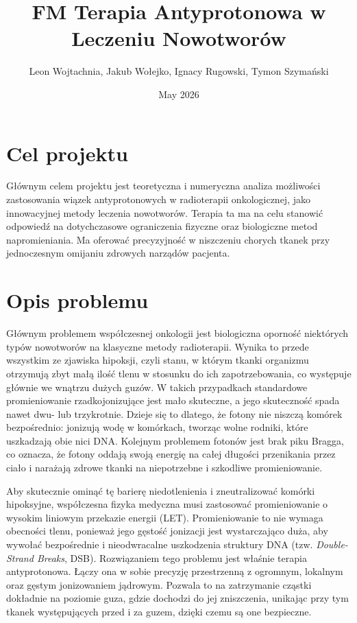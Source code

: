 \documentclass{article}
\title{FM Terapia Antyprotonowa w Leczeniu Nowotworów}
\author{Leon Wojtachnia, Jakub Wołejko, Ignacy Rugowski, Tymon Szymański}
\date{May 2026}
\begin{document}
\maketitle

\section{Cel projektu}
Głównym celem projektu jest teoretyczna i numeryczna analiza możliwości zastosowania wiązek antyprotonowych w radioterapii onkologicznej, jako innowacyjnej metody leczenia nowotworów. Terapia ta ma na celu stanowić odpowiedź na dotychczasowe ograniczenia fizyczne oraz biologiczne metod napromieniania. Ma oferować precyzyjność w niszczeniu chorych tkanek przy jednoczesnym omijaniu zdrowych narządów pacjenta.

\section{Opis problemu}
Głównym problemem współczesnej onkologii jest biologiczna oporność niektórych typów nowotworów na klasyczne metody radioterapii. Wynika to przede wszystkim ze zjawiska hipoksji, czyli stanu, w którym tkanki organizmu otrzymują zbyt małą ilość tlenu w stosunku do ich zapotrzebowania, co występuje głównie we wnątrzu dużych guzów. W takich przypadkach standardowe promieniowanie rzadkojonizujące jest mało skuteczne, a jego skuteczność spada nawet dwu- lub trzykrotnie. Dzieje się to dlatego, że fotony nie niszczą komórek bezpośrednio: jonizują wodę w komórkach, tworząc wolne rodniki, które uszkadzają obie nici DNA. Kolejnym problemem fotonów jest brak piku Bragga, co oznacza, że fotony oddają swoją energię na całej długości przenikania przez ciało i narażają zdrowe tkanki na niepotrzebne i szkodliwe promieniowanie.

Aby skutecznie ominąć tę barierę niedotlenienia i zneutralizować komórki hipoksyjne, współczesna fizyka medyczna musi zastosować promieniowanie o wysokim liniowym przekazie energii (LET). Promieniowanie to nie wymaga obecności tlenu, ponieważ jego gęstość jonizacji jest wystarczająco duża, aby wywołać bezpośrednie i nieodwracalne uszkodzenia struktury DNA (tzw. \textit{Double-Strand Breaks}, DSB). Rozwiązaniem tego problemu jest właśnie terapia antyprotonowa. Łączy ona w sobie precyzję przestrzenną z ogromnym, lokalnym oraz gęstym jonizowaniem jądrowym. Pozwala to na zatrzymanie cząstki dokładnie na poziomie guza, gdzie dochodzi do jej zniszczenia, unikając przy tym tkanek występujących przed i za guzem, dzięki czemu są one bezpieczne.
\end{document}
